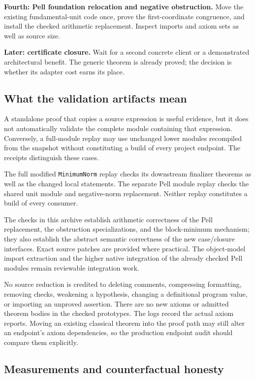 \documentclass[11pt,letterpaper]{article}
\newcommand{\code}[1]{\nolinkurl{#1}}
\begin{document}
\textbf{Fourth: Pell foundation relocation and negative obstruction.} Move the existing fundamental-unit code once, prove the first-coordinate congruence, and install the checked arithmetic replacement. Inspect imports and axiom sets as well as source size.

\textbf{Later: certificate closure.} Wait for a second concrete client or a demonstrated architectural benefit. The generic theorem is already proved; the decision is whether its adapter cost earns its place.

\subsection{What the validation artifacts mean}

A standalone proof that copies a source expression is useful evidence, but it does not automatically validate the complete module containing that expression. Conversely, a full-module replay may use unchanged lower modules recompiled from the snapshot without constituting a build of every project endpoint. The receipts distinguish these cases.

The full modified \code{MinimumNorm} replay checks its downstream finalizer theorems as well as the changed local statements. The separate Pell module replay checks the shared unit module and negative-norm replacement. Neither replay constitutes a build of every consumer.

The checks in this archive establish arithmetic correctness of the Pell replacement, the obstruction specializations, and the block-minimum mechanism; they also establish the abstract semantic correctness of the new case/closure interfaces. Exact source patches are provided where practical. The object-model import extraction and the higher native integration of the already checked Pell modules remain reviewable integration work.

No source reduction is credited to deleting comments, compressing formatting, removing checks, weakening a hypothesis, changing a definitional program value, or importing an unproved assertion. There are no new axioms or admitted theorem bodies in the checked prototypes. The logs record the actual axiom reports. Moving an existing classical theorem into the proof path may still alter an endpoint's axiom dependencies, so the production endpoint audit should compare them explicitly.

\subsection{Measurements and counterfactual honesty}
\end{document}
